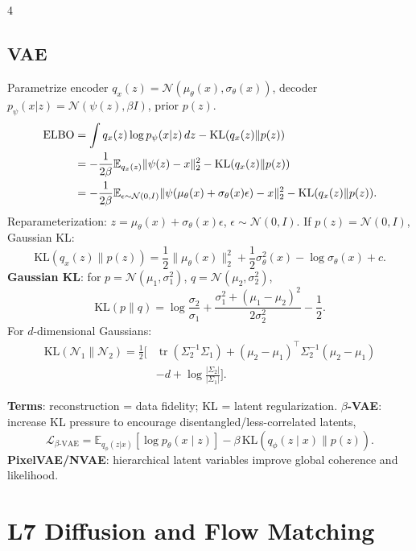 \documentclass{article}
\newcommand{\key}[1]{\textbf{#1}}
\newcommand{\E}{\mathbb{E}}
\newcommand{\N}{\mathcal{N}}
\newcommand{\KL}{\mathrm{KL}}
\newcommand{\1}{\mathbf 1}
\DeclareMathOperator{\tr}{tr}
\begin{document}
\begin{multicols*}{4}
\subsection{VAE}
Parametrize encoder $q_x(z)=\N(\mu_\theta(x),\sigma_\theta(x))$, decoder $p_\psi(x|z)=\N(\psi(z),\beta I)$, prior $p(z)$. 
\[
\begin{aligned}
{\rm ELBO}
&=\int q_x(z)\log p_\psi(x|z)\,dz-\KL(q_x(z)\|p(z))\\
&=-\frac1{2\beta}\E_{q_x(z)}\|\psi(z)-x\|_2^2-\KL(q_x(z)\|p(z))\\
&=-\frac1{2\beta}\E_{\epsilon\sim\N(0,I)}
\|\psi(\mu_\theta(x)+\sigma_\theta(x)\epsilon)-x\|_2^2-\KL(q_x(z)\|p(z)).
\end{aligned}
\]
Reparameterization: $z=\mu_\theta(x)+\sigma_\theta(x)\epsilon$, $\epsilon\sim\N(0,I)$. If $p(z)=\N(0,I)$, Gaussian KL:
\[
\KL(q_x(z)\|p(z))
=\frac12\|\mu_\theta(x)\|_2^2+\frac12\sigma_\theta^2(x)-\log\sigma_\theta(x)+c.
\]
\key{Gaussian KL}: for $p=\N(\mu_1,\sigma_1^2)$, $q=\N(\mu_2,\sigma_2^2)$,
\[
\KL(p\|q)=\log\frac{\sigma_2}{\sigma_1}
+\frac{\sigma_1^2+(\mu_1-\mu_2)^2}{2\sigma_2^2}-\frac12.
\]
For $d$-dimensional Gaussians:
\[
\begin{aligned}
\KL(\N_1\|\N_2)=\frac12[&
\tr(\Sigma_2^{-1}\Sigma_1)+(\mu_2-\mu_1)^\top\Sigma_2^{-1}(\mu_2-\mu_1)\\
&-d+\log\frac{|\Sigma_2|}{|\Sigma_1|}].
\end{aligned}
\]

\key{Terms}: reconstruction = data fidelity; KL = latent regularization. \key{$\beta$-VAE}: increase KL pressure to encourage disentangled/less-correlated latents,
\[
\mathcal L_{\beta\text{-VAE}}
=\E_{q_\phi(z|x)}[\log p_\theta(x\mid z)]
-\beta\,\KL(q_\phi(z\mid x)\|p(z)).
\]
\key{PixelVAE/NVAE}: hierarchical latent variables improve global coherence and likelihood.

\section{L7 Diffusion and Flow Matching}

\end{multicols*}
\end{document}
